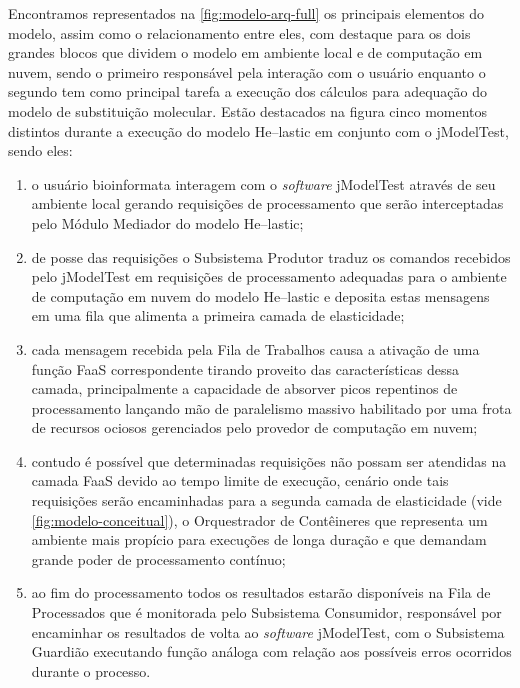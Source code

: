 \documentclass[english,brazilian]{UNISINOSmonografia} %
\begin{document}
Encontramos representados na \autoref{fig:modelo-arq-full} os principais elementos do modelo, assim como o relacionamento entre eles, com destaque para os dois grandes blocos que dividem o modelo em ambiente local e de computação em nuvem, sendo o primeiro responsável pela interação com o usuário enquanto o segundo tem como principal tarefa a execução dos cálculos para adequação do modelo de substituição molecular.
Estão destacados na figura cinco momentos distintos durante a execução do modelo \textsf{He}--lastic em conjunto com o jModelTest, sendo eles: 
\begin{enumerate}[label={\arabic*)}]

	\item o usuário bioinformata interagem com o \textit{software} jModelTest através de seu ambiente local gerando requisições de processamento que serão interceptadas pelo Módulo Mediador do modelo \textsf{He}--lastic;

	\item de posse das requisições o Subsistema Produtor traduz os comandos recebidos pelo jModelTest em requisições de processamento adequadas para o ambiente de computação em nuvem do modelo \textsf{He}--lastic e deposita estas mensagens em uma fila que alimenta a primeira camada de elasticidade;
	
	\item cada mensagem recebida pela Fila de Trabalhos causa a ativação de uma função FaaS correspondente tirando proveito das características dessa camada, principalmente a capacidade de absorver picos repentinos de processamento lançando mão de paralelismo massivo habilitado por uma frota de recursos ociosos gerenciados pelo provedor de computação em nuvem;
	
	\item contudo é possível que determinadas requisições não possam ser atendidas na camada FaaS devido ao tempo limite de execução, cenário onde tais requisições serão encaminhadas para a segunda camada de elasticidade (vide \autoref{fig:modelo-conceitual}), o Orquestrador de Contêineres que representa um ambiente mais propício para execuções de longa duração e que demandam grande poder de processamento contínuo;
	
	\item ao fim do processamento todos os resultados estarão disponíveis na Fila de Processados que é monitorada pelo Subsistema Consumidor, responsável por encaminhar os resultados de volta ao \textit{software} jModelTest, com o Subsistema Guardião executando função análoga com relação aos possíveis erros ocorridos durante o processo.
\end{enumerate}
\end{document}
